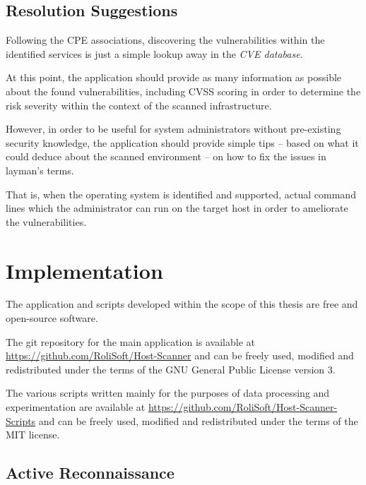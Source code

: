 \documentclass[a4paper,12pt]{article}
\begin{document}
\subsection{Resolution Suggestions}
 
	
	Following the CPE associations, discovering the vulnerabilities within the identified services is just a simple lookup away in the \textit{CVE database}.
	
	At this point, the application should provide as many information as possible about the found vulnerabilities, including CVSS scoring in order to determine the risk severity within the context of the scanned infrastructure.
	
	However, in order to be useful for system administrators without pre-existing security knowledge, the application should provide simple tips -- based on what it could deduce about the scanned environment -- on how to fix the issues in layman's terms.
	
	That is, when the operating system is identified and supported, actual command lines which the administrator can run on the target host in order to ameliorate the vulnerabilities.
	
\section{Implementation} \label{impl}
 

	The application and scripts developed within the scope of this thesis are free and open-source software.
	
	The git repository for the main application is available at \url{https://github.com/RoliSoft/Host-Scanner} and can be freely used, modified and redistributed under the terms of the GNU General Public License version 3\cite{gplv3}.
		
	The various scripts written mainly for the purposes of data processing and experimentation are available at \url{https://github.com/RoliSoft/Host-Scanner-Scripts} and can be freely used, modified and redistributed under the terms of the MIT license\cite{mit}.

\subsection{Active Reconnaissance}
 
\end{document}
